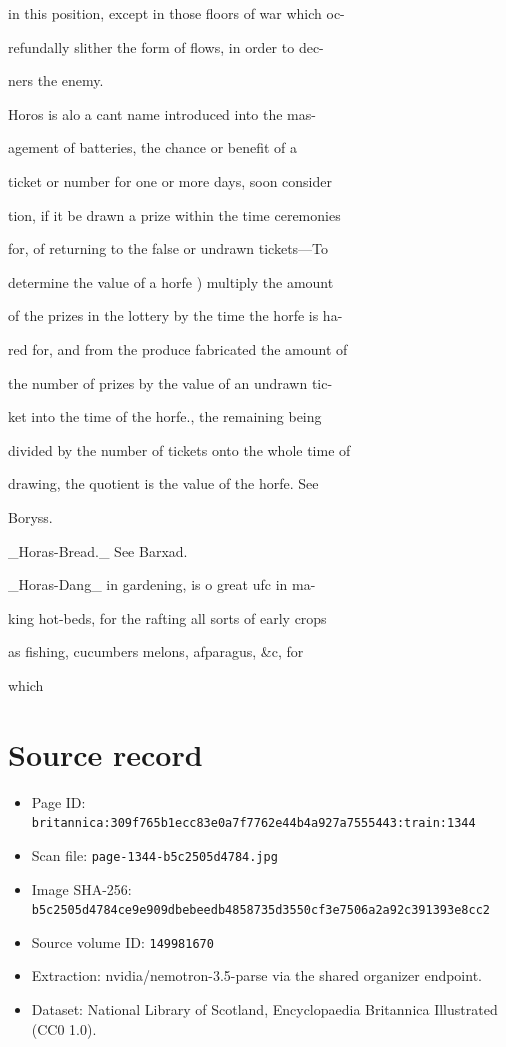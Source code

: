 \documentclass{article}
\begin{document}
in this position, except in those floors of war which oc-

refundally slither the form of flows, in order to dec-

ners the enemy.

Horos is alo a cant name introduced into the mas-

agement of batteries, the chance or benefit of a

ticket or number for one or more days, soon consider

tion, if it be drawn a prize within the time ceremonies

for, of returning to the false or undrawn tickets—To

determine the value of a horfe ) multiply the amount

of the prizes in the lottery by the time the horfe is ha-

red for, and from the produce fabricated the amount of

the number of prizes by the value of an undrawn tic-

ket into the time of the horfe., the remaining being

divided by the number of tickets onto the whole time of

drawing, the quotient is the value of the horfe. See

Boryss.

\_Horas-Bread.\_ See Barxad.

\_Horas-Dang\_ in gardening, is o great ufc in ma-

king hot-beds, for the rafting all sorts of early crops

as fishing, cucumbers melons, afparagus, \&c, for

which

\section*{Source record}
\begin{itemize}
\item Page ID: \texttt{britannica:309f765b1ecc83e0a7f7762e44b4a927a7555443:train:1344}
\item Scan file: \texttt{page-1344-b5c2505d4784.jpg}
\item Image SHA-256: \texttt{b5c2505d4784ce9e909dbebeedb4858735d3550cf3e7506a2a92c391393e8cc2}
\item Source volume ID: \texttt{149981670}
\item Extraction: nvidia/nemotron-3.5-parse via the shared organizer endpoint.
\item Dataset: National Library of Scotland, Encyclopaedia Britannica Illustrated (CC0 1.0).
\end{itemize}
\end{document}
